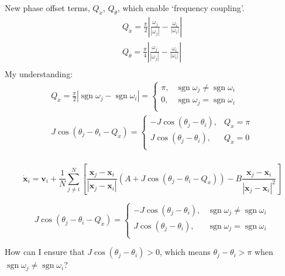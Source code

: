 \documentclass[10pt,aspectratio=43,mathserif,table]{beamer}
\begin{document}
\begin{frame}
    New phase offset terms, $Q_{\dot{x}}$, $Q_{\dot{\theta}}$, which enable ‘frequency coupling’.
    $$
    \begin{array}{c}
        Q_{\dot{x}}=\frac{\pi}{2}\left| \frac{\omega _j}{\left| \omega _j \right|}-\frac{\omega _i}{\left| \omega _i \right|} \right|\\
        Q_{\dot{\theta}}=\frac{\pi}{4}\left| \frac{\omega _j}{\left| \omega _j \right|}-\frac{\omega _i}{\left| \omega _i \right|} \right|\\
    \end{array}
    $$
    My understanding: 
    $$
    \begin{array}{c}
    Q_{\dot{x}}=\frac{\pi}{2}\left| \operatorname{sgn} \omega _j-\operatorname{sgn} \omega _i \right|=\begin{cases}
    \pi ,&		\operatorname{sgn} \omega _j\ne\operatorname{sgn} \omega _i\\
    0,&		\operatorname{sgn} \omega _j= \operatorname{sgn} \omega _i\\
    \end{cases}\\
    J\cos \left( \theta _j-\theta _i-Q_{\dot{x}} \right) =\begin{cases}
    -J\cos \left( \theta _j-\theta _i \right) ,&		Q_{\dot{x}}=\pi\\
    J\cos \left( \theta _j-\theta _i \right) ,&		Q_{\dot{x}}=0\\
    \end{cases}\\
    \end{array}
    $$
    
    
\end{frame}

\begin{frame}
    $$
    \dot{\mathbf{x}}_i=\mathbf{v}_i+\frac{1}{N}\sum_{j\ne i}^N{\left[ \frac{\mathbf{x}_j-\mathbf{x}_i}{\left| \mathbf{x}_j-\mathbf{x}_i \right|}\left( A+J\cos \left( \theta _j-\theta _i-Q_{\dot{x}} \right) \right) -B\frac{\mathbf{x}_j-\mathbf{x}_i}{\left| \mathbf{x}_j-\mathbf{x}_i \right|^2} \right]}
    $$

    $$
    J\cos \left( \theta _j-\theta _i-Q_{\dot{x}} \right) =\begin{cases}
        -J\cos \left( \theta _j-\theta _i \right) ,&		\operatorname{sgn} \omega _j\ne\operatorname{sgn} \omega _i\\
        J\cos \left( \theta _j-\theta _i \right) ,&		\operatorname{sgn} \omega _j= \operatorname{sgn} \omega _i\\
    \end{cases}
    $$
    \newline

    How can I ensure that $J\cos \left( \theta _j-\theta _i \right) > 0$, which means $\theta _j-\theta _i > \pi$ when $\operatorname{sgn} \omega _j\ne\operatorname{sgn} \omega _i$?
\end{frame}
\end{document}
